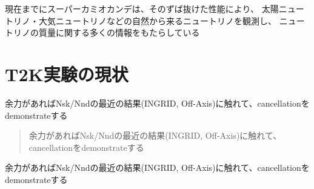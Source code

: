 現在までにスーパーカミオカンデは、そのずば抜けた性能により、
太陽ニュートリノ・大気ニュートリノなどの自然から来るニュートリノを観測し、
ニュートリノの質量に関する多くの情報をもたらしている

\section{T2K実験の現状}
余力があればNsk/Nndの最近の結果(INGRID, Off-Axis)に触れて、cancellationをdemonstrateする

\begin{quote}
余力があればNsk/Nndの最近の結果(INGRID, Off-Axis)に触れて、cancellationをdemonstrateする
\end{quote}

余力があればNsk/Nndの最近の結果(INGRID, Off-Axis)に触れて、cancellationをdemonstrateする
\fi